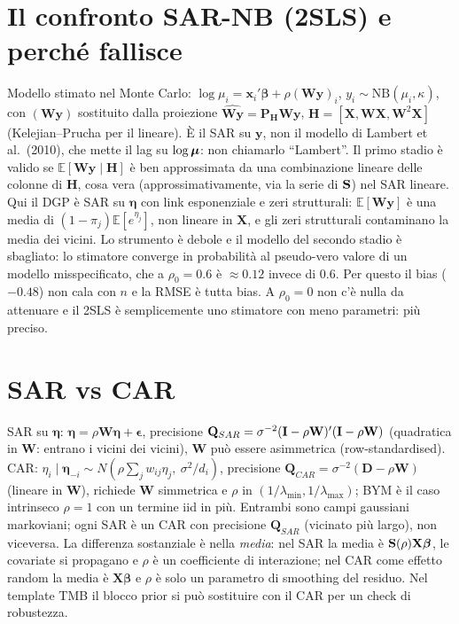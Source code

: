 \documentclass[11pt,a4paper]{article}
\newcommand{\E}{\mathbb{E}}
\newcommand{\bW}{\mathbf{W}}\newcommand{\bX}{\mathbf{X}}\newcommand{\bZ}{\mathbf{Z}}\newcommand{\by}{\mathbf{y}}
\newcommand{\beeta}{\boldsymbol{\eta}}\newcommand{\bbeta}{\boldsymbol{\beta}}\newcommand{\bgamma}{\boldsymbol{\gamma}}
\begin{document}
\section{Il confronto SAR-NB (2SLS) e perché fallisce}\label{app:2sls}
Modello stimato nel Monte Carlo: $\log\mu_i=\mathbf x_i'\bbeta+\rho(\bW\by)_i$, $y_i\sim\mathrm{NB}(\mu_i,\kappa)$, con $(\bW\by)$ sostituito dalla proiezione $\widehat{\bW\by}=\mathbf P_{\mathbf H}\bW\by$, $\mathbf H=[\bX,\bW\bX,\bW^2\bX]$ (Kelejian--Prucha per il lineare). \`E il SAR su $\by$, non il modello di Lambert et al.\ (2010), che mette il lag su $\log\boldsymbol{\mu}$: non chiamarlo ``Lambert''. Il primo stadio è valido se $\E[\bW\by\mid\mathbf H]$ è ben approssimata da una combinazione lineare delle colonne di $\mathbf H$, cosa vera (approssimativamente, via la serie di $\mathbf{S}$) nel SAR lineare. Qui il DGP è SAR su $\beeta$ con link esponenziale e zeri strutturali: $\E[\bW\by]$ è una media di $(1-\pi_j)\E[e^{\eta_j}]$, non lineare in $\bX$, e gli zeri strutturali contaminano la media dei vicini. Lo strumento è debole e il modello del secondo stadio è sbagliato: lo stimatore converge in probabilità al pseudo-vero valore di un modello misspecificato, che a $\rho_0=0.6$ è $\approx0.12$ invece di 0.6. Per questo il bias ($-0.48$) non cala con $n$ e la RMSE è tutta bias. A $\rho_0=0$ non c'è nulla da attenuare e il 2SLS è semplicemente uno stimatore con meno parametri: più preciso.

\section{SAR vs CAR}\label{app:sarcar}
SAR su $\beeta$: $\beeta=\rho\bW\beeta+\boldsymbol\epsilon$, precisione $\mathbf Q_{SAR}=\sigma^{-2}(\bI-\rho\bW)'(\bI-\rho\bW)$ (quadratica in $\bW$: entrano i vicini dei vicini), $\bW$ può essere asimmetrica (row-standardised). CAR: $\eta_i\mid\beeta_{-i}\sim N(\rho\sum_jw_{ij}\eta_j,\ \sigma^2/d_i)$, precisione $\mathbf Q_{CAR}=\sigma^{-2}(\mathbf D-\rho\bW)$ (lineare in $\bW$), richiede $\bW$ simmetrica e $\rho$ in $(1/\lambda_{\min},1/\lambda_{\max})$; BYM è il caso intrinseco $\rho=1$ con un termine iid in più. Entrambi sono campi gaussiani markoviani; ogni SAR è un CAR con precisione $\mathbf Q_{SAR}$ (vicinato più largo), non viceversa. La differenza sostanziale è nella \emph{media}: nel SAR la media è $\bS(\rho)\bX\bbeta$, le covariate si propagano e $\rho$ è un coefficiente di interazione; nel CAR come effetto random la media è $\bX\bbeta$ e $\rho$ è solo un parametro di smoothing del residuo. Nel template TMB il blocco prior si può sostituire con il CAR per un check di robustezza.
\end{document}

